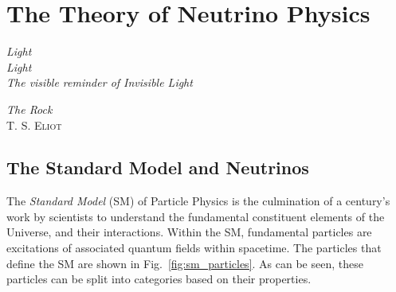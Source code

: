 
\chapter{The Theory of Neutrino Physics}\label{chap:theory}
\setlength{\epigraphwidth}{.45\textwidth}
\epigraph{\textit{Light\\Light\\The visible reminder of Invisible Light}}{\textit{The Rock}\\\textsc{T. S. Eliot}}
\setlength{\epigraphwidth}{.4\textwidth}

\section{The Standard Model and Neutrinos}
The \textit{Standard Model} (SM) of Particle Physics is the culmination of a century's work by scientists to understand the fundamental constituent elements of the Universe, and their interactions. Within the SM, fundamental particles are excitations of associated quantum fields within spacetime. The particles that define the SM are shown in Fig.~\ref{fig:sm_particles}. As can be seen, these particles can be split into categories based on their properties.


